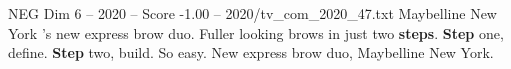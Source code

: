 \begin{textsample}{NEG Dim 6 – 2020 – Score -1.00 – 2020/tv\_com\_2020\_47.txt}  \label{ex:f6_neg_057}
Maybelline New York 's new express brow duo.
Fuller looking brows in just two \textbf{steps}. \textbf{Step} one, define. \textbf{Step} two, build.
So easy.
New express brow duo, Maybelline New York.

\end{textsample}

